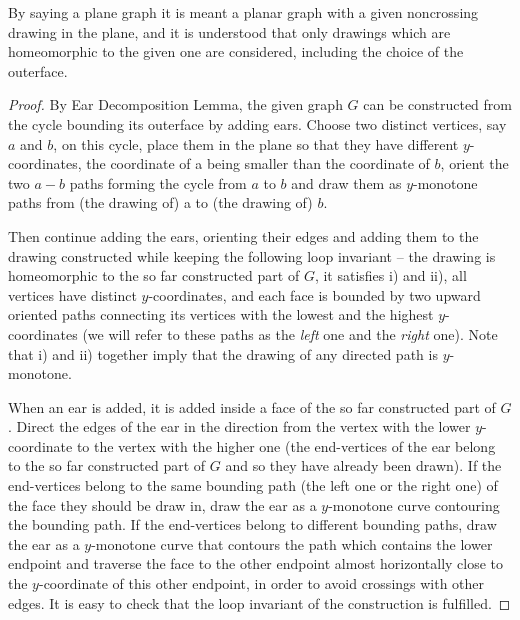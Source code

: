 \begin{comm}
	By saying a plane graph it is meant a planar graph with a given noncrossing drawing in the plane, and it is understood that only drawings which are homeomorphic to the given one are considered, including the choice of the outerface.
\end{comm}

\begin{proof}
	By Ear Decomposition Lemma, the given graph $G$ can be constructed from the cycle bounding its outerface by adding ears. Choose two distinct vertices, say $a$ and $b$, on this cycle, place them in the plane so that they have different $y$-coordinates, the coordinate of a being smaller than the coordinate of $b$, orient the two $a - b$ paths forming the cycle from $a$ to $b$ and draw them as $y$-monotone paths from (the drawing of) a to (the drawing of) $b$.
	
	Then continue adding the ears, orienting their edges and adding them to the drawing constructed while keeping the following loop invariant -- the drawing is homeomorphic to the so far constructed part of $G$, it satisfies i) and ii), all vertices have distinct $y$-coordinates, and each face is bounded by two upward oriented paths connecting its vertices with the lowest and the highest $y$-coordinates (we will refer to these paths as the \textit{left} one and the \textit{right} one). Note that i) and ii) together imply that the drawing of any directed path is $y$-monotone.
	
	When an ear is added, it is added inside a face of the so far constructed part of $G$. Direct the edges of the ear in the direction from the vertex with the lower $y$-coordinate to the vertex with the higher one (the end-vertices of the ear belong to the so far constructed part of $G$ and so they have already been drawn). If the end-vertices belong to the same bounding path (the left one or the right one) of the face they should be draw in, draw the ear as a $y$-monotone curve contouring the bounding path. If the end-vertices belong to different bounding paths, draw the ear as a $y$-monotone curve that contours the path which contains the lower endpoint and traverse the face to the other endpoint almost horizontally close to the $y$-coordinate of this other endpoint, in order to avoid crossings with other edges. It is easy to check that the loop invariant of the construction is fulfilled.
\end{proof}

